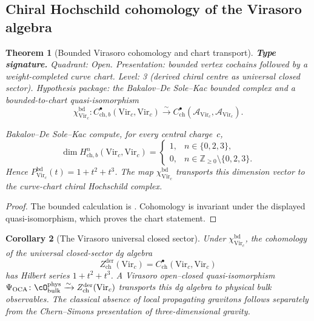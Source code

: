\documentclass[11pt,reqno]{amsart}
\newtheorem{theorem}{Theorem}[section]
\newtheorem{corollary}[theorem]{Corollary}
\theoremstyle{definition}
\theoremstyle{remark}
\providecommand{\cA}{\mathcal{A}}
\begin{document}
\subsection{Chiral Hochschild cohomology of the Virasoro algebra}

\begin{theorem}[Bounded Virasoro cohomology and chart transport]
\label{thm:vir-hochschild}
\textbf{Type signature.} Quadrant: Open.
Presentation: bounded vertex cochains followed by a
weight-completed curve chart.
Level: 3 (derived chiral centre as universal closed sector).
Hypothesis package: the Bakalov--De Sole--Kac bounded complex and a
bounded-to-chart quasi-isomorphism
\[
 \chi^{\mathrm{bd}}_{\mathrm{Vir}_c}\colon
 C^\bullet_{\mathrm{ch},b}(\mathrm{Vir}_c,\mathrm{Vir}_c)
 \xrightarrow{\sim}
 C^\bullet_{\mathrm{ch}}(\cA_{\mathrm{Vir}_c},
 \cA_{\mathrm{Vir}_c}).
\]

Bakalov--De Sole--Kac compute, for every central charge~$c$,
\begin{equation}\label{eq:hhn}
 \dim H^n_{\mathrm{ch},b}(\mathrm{Vir}_c,\mathrm{Vir}_c)
 =
 \begin{cases}
  1,&n\in\{0,2,3\},\\
  0,&n\in\mathbb Z_{\geq0}\setminus\{0,2,3\}.
 \end{cases}
\end{equation}
Hence $P^{\mathrm{bd}}_{\mathrm{Vir}_c}(t)=1+t^2+t^3$.
The map $\chi^{\mathrm{bd}}_{\mathrm{Vir}_c}$ transports this
dimension vector to the curve-chart chiral Hochschild complex.
\end{theorem}

\begin{proof}
The bounded calculation is \cite[Theorem~7.2]{BDSK21}.  Cohomology
is invariant under the displayed quasi-isomorphism, which proves the
chart statement.
\end{proof}

\begin{corollary}[The Virasoro universal closed sector]
\label{cor:bulk-gravity}
Under $\chi^{\mathrm{bd}}_{\mathrm{Vir}_c}$, the cohomology of the
universal closed-sector dg algebra
\begin{equation}\label{eq:bulk}
 Z^{\mathrm{der}}_{\mathrm{ch}}(\mathrm{Vir}_c)
 =C^\bullet_{\mathrm{ch}}(\mathrm{Vir}_c,\mathrm{Vir}_c)
\end{equation}
has Hilbert series $1+t^2+t^3$.  A Virasoro open--closed
quasi-isomorphism
$\Psi_{\mathrm{OCA}}\colon\cO^{\mathrm{phys}}_{\mathrm{bulk}}
\xrightarrow{\sim}Z^{\mathrm{der}}_{\mathrm{ch}}(\mathrm{Vir}_c)$
transports this dg algebra to physical bulk observables.  The
classical absence of local propagating gravitons follows separately
from the Chern--Simons presentation of three-dimensional gravity.
\end{corollary}
\end{document}
